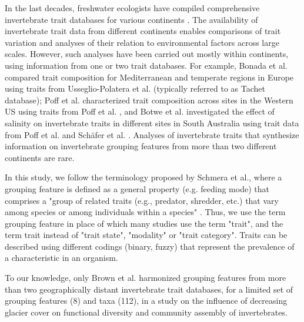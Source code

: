 \documentclass{article}
\begin{document}
In the last decades, freshwater ecologists have compiled comprehensive invertebrate trait databases for various continents \cite{usseglio-polatera_biomonitoring_2000, schmidt-kloiber_www.freshwaterecology.info_2015, vieira_database_nodate, Philips_and_Smith_NZ_DB_2018, kefford_integrated_2020, tomanova_trophic_2006}. The availability of invertebrate trait data from different continents enables comparisons of trait variation and analyses of their relation to environmental factors across large scales. However, such analyses have been carried out mostly within continents, using information from one or two trait databases. For example, Bonada et al. \cite{bonada_taxonomic_2007} compared trait composition for Mediterranean and temperate regions in Europe using traits from Usseglio-Polatera et al. \cite{usseglio-polatera_biomonitoring_2000}(typically referred to as Tachet database); Poff et al. \cite{poff_developing_2010} characterized trait composition across sites in the Western US using traits from Poff et al. \cite{poff_functional_2006}, and Botwe et al. \cite{botwe_effects_2018} investigated the effect of salinity on invertebrate traits in different sites in South Australia using trait data from Poff et al. \cite{poff_functional_2006} and Schäfer et al. \cite{schafer_trait_2011}. Analyses of invertebrate traits that synthesize information on invertebrate grouping features from more than two different continents are rare. 

In this study, we follow the terminology proposed by Schmera et al., where a grouping feature is defined as a general property (e.g. feeding mode) that comprises a "group of related traits (e.g., predator, shredder, etc.) that vary among species or among individuals within a species" \cite{schmera_proposed_2015}. Thus, we use the term grouping feature in place of which many studies use the term "trait", and the term trait instead of "trait state", "modality" or "trait category". Traits can be described using different codings (binary, fuzzy) that represent the prevalence of a characteristic in an organism.

To our knowledge, only Brown et al. \cite{brown_functional_2018} harmonized grouping features from more than two geographically distant invertebrate trait databases, for a limited set of grouping features (8) and taxa (112), in a study on the influence of decreasing glacier cover on functional diversity and community assembly of invertebrates. 
\end{document}

